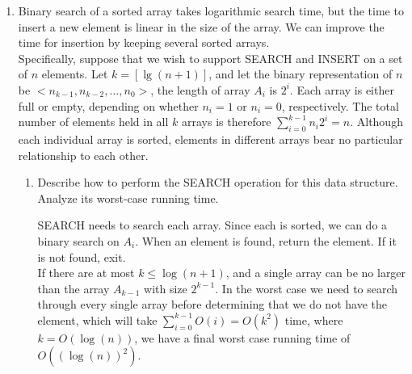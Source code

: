 \documentclass{article}
\begin{document}
\begin{enumerate}
\item Binary search of a sorted array takes logarithmic search time, but the time to insert a new element is linear in the size of the array. We can improve the time for insertion by keeping several sorted arrays. \\
\newline
Specifically, suppose that we wish to support SEARCH and INSERT on a set of $n$ elements. Let $k = [\lg(n+1)]$, and let the binary representation of $n$ be $<n_{k-1}, n_{k-2}, \dots, n_0>$, the length of array $A_i$ is $2^i$. Each array is either full or empty, depending on whether $n_i = 1$ or $n_i = 0$, respectively. The total number of elements held in all $k$ arrays is therefore $\sum_{i=0}^{k-1}n_i2^i = n$. Although each individual array is sorted, elements in different arrays bear no particular relationship to each other.
\begin{enumerate}
\item Describe how to perform the SEARCH operation for this data structure. Analyze its worst-case running time. \\
\newline

SEARCH needs to search each array. Since each is sorted, we can do a binary search on $A_i$. When an element is found, return the element. If it is not found, exit. \\
\newline 
If there are at most $k \leq \log(n+1)$, and a single array can be no larger than the array $A_{k-1}$ with size $2^{k-1}$. In the worst case we need to search through every single array before determining that we do not have the element, which will take $\sum_{i=0}^{k-1}O(i) = O(k^2)$ time, where $k = O(\log(n))$, we have a final worst case running time of $O((\log(n))^2)$. \\
\newline









\end{enumerate}
\end{enumerate}
\end{document}
